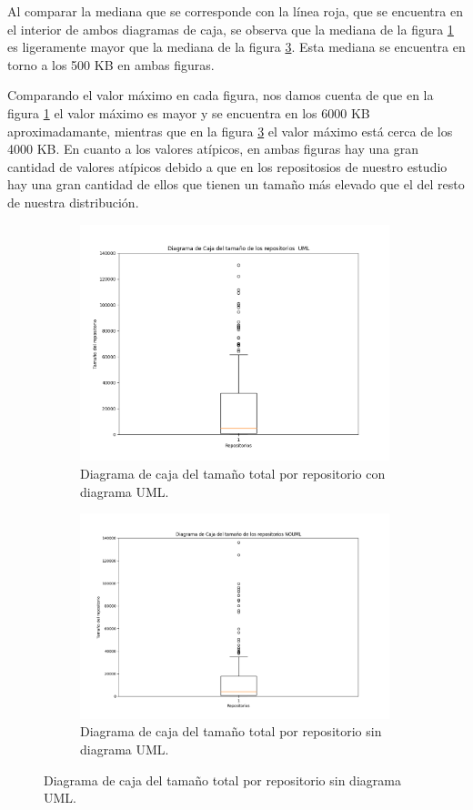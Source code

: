 \documentclass[a4paper, 12pt]{book}
\begin{document}
Al comparar la mediana que se corresponde con la línea roja, que se encuentra en el interior de ambos diagramas de caja, se observa que la mediana de la figura \ref{fig:Figure_sizeUML} es ligeramente mayor que la mediana de la figura \ref{fig:Figure_sizeNOUML}.
Esta mediana se encuentra en torno a los 500 KB en ambas figuras.


Comparando el valor máximo en cada figura, nos damos cuenta de que en la figura \ref{fig:Figure_sizeUML} el valor máximo es mayor y se encuentra en los 6000 KB aproximadamante, mientras que en la figura \ref{fig:Figure_sizeNOUML} el valor máximo está cerca de los 4000 KB.
En cuanto a los valores atípicos, en ambas figuras hay una gran cantidad de valores atípicos debido a que en los repositosios de nuestro estudio hay una gran cantidad de ellos que tienen un tamaño más elevado que el del resto de nuestra distribución.

\begin{figure}
  \centering
  \begin{subfigure}{0.45\linewidth}
    \centering
    \includegraphics[width=9cm, keepaspectratio]{img/Figure_sizeUML.png}
    \caption{Diagrama de caja del tamaño total por repositorio con diagrama UML.}\label{fig:Figure_sizeUML}
  \end{subfigure}
  \hfill
    \begin{subfigure}{0.45\linewidth}
      \centering
      \includegraphics[width=9cm, keepaspectratio]{img/Figure_sizeNOUML.png}
      \caption{Diagrama de caja del tamaño total por repositorio sin diagrama UML.}\label{fig:Figure_sizeNOUML}
  \end{subfigure}
\end{figure}
\end{document}
